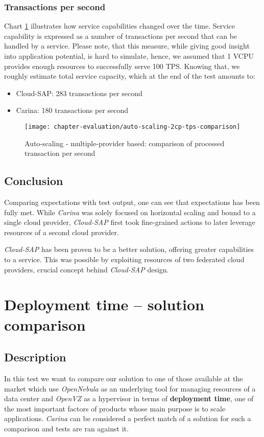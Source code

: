 \subsubsection*{Transactions per second}
Chart \ref{fig:auto-scaling-2cp-tps-comparison} illustrates how service capabilities changed over the time. Service capability is expressed as a number of transactions per second that can be handled by a service. Please note, that this measure, while giving good insight into application potential, is hard to simulate, hence, we assumed that 1 VCPU provides enough resources to successfully serve 100 TPS. Knowing that, we roughly estimate total service capacity, which at the end of the test amounts to:
\begin{itemize}
 \item Cloud-SAP: 283 transactions per second
 \item Carina: 180 transactions per second
\end{itemize}

\begin{figure}[!ht]
  \begin{center}
    \texttt{[image: chapter-evaluation/auto-scaling-2cp-tps-comparison]}
  \end{center}
  \caption{Auto-scaling - multiple-provider based: comparison of processed transaction per second}
  \label{fig:auto-scaling-2cp-tps-comparison}
\end{figure}

\subsection*{Conclusion}
Comparing expectations with test output, one can see that expectations has been fully met. While \emph{Carina} was solely focused on horizontal scaling and bound to a single cloud provider, \emph{Cloud-SAP} first took fine-grained actions to later leverage resources of a second cloud provider.

\emph{Cloud-SAP} has been proven to be a better solution, offering greater capabilities to a service. This was possible by exploiting resources of two federated cloud providers, crucial concept behind \emph{Cloud-SAP} design.


\section{Deployment time -- solution comparison}
\subsection*{Description}
In this test we want to compare our solution to one of those available at the market which use \emph{OpenNebula} as an underlying tool for managing resources of a data center and \emph{OpenVZ} as a hypervisor in terms of \textbf{deployment time}, one of the most important factors of products whose main purpose is to scale applications.
\emph{Carina} \cite{Carina} can be considered a perfect match of a solution for such a comparison and tests are ran against it.

